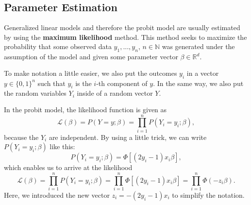 \subsection{Parameter Estimation}

Generalized linear models and therefore the probit model are usually
estimated by using the \textbf{maximum likelihood} method.
This method seeks to maximize the probability that some observed
data $y_1, ..., y_n$, $n \in \mathbb{N}$ was generated under the
assumption of the model and given some parameter vector
$\beta \in \mathbb{R}^d$.

To make notation a little easier, we also put the outcomes $y_i$
in a vector $y \in \{0, 1\}^n$ such that $y_i$ is the $i$-th
component of $y$. In the same way, we also put the random
variables $Y_i$ inside of a random vector $Y$.

In the probit model, the likelihood function is given as
\begin{equation}
    \mathcal{L}(\beta) = P(Y=y ; \beta) = \prod_{i=1}^n P(Y_i=y_i ; \beta),
\end{equation}
because the $Y_i$ are independent. By using a little trick, we can
write $P(Y_i=y_i;\beta)$ like this:
\begin{equation*}
    P(Y_i = y_i ; \beta) = \Phi[(2y_i - 1) x_i \beta],
\end{equation*}
which enables us to arrive at the likelihood
\begin{equation}
    \mathcal{L}(\beta) = \prod_{i=1}^n P(Y_i=y_i ; \beta)
    = \prod_{i=1}^n \Phi[(2y_i - 1) x_i \beta]
    = \prod_{i=1}^n \Phi(- z_i \beta).
\end{equation}
Here, we introduced the new vector $z_i = - (2y_i - 1) x_i$ to simplify
the notation.

